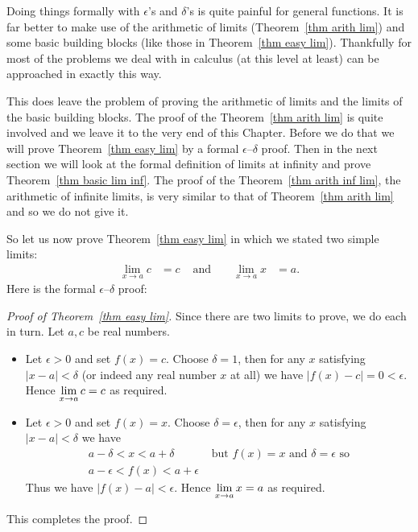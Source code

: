Doing things formally with $\epsilon$'s and $\delta$'s is quite painful for
general functions. It is far better to make use of the arithmetic of limits
(Theorem~\ref{thm arith lim}) and some basic building blocks (like those in
Theorem~\ref{thm easy lim}). Thankfully for most of the problems we deal with in
calculus (at this level at least) can be approached in exactly this way.

This does leave the problem of proving the arithmetic of limits and the limits
of the basic building blocks. The proof of the Theorem~\ref{thm arith lim} is
quite involved and we leave it to the very end of this Chapter. Before we do
that we will prove Theorem~\ref{thm easy lim} by a formal $\epsilon$--$\delta$
proof. Then in the next section we will look at the formal definition of limits
at infinity and prove Theorem~\ref{thm basic lim inf}. The proof of the
Theorem~\ref{thm arith inf lim}, the arithmetic of infinite limits, is very
similar to that of Theorem~\ref{thm arith lim} and so we do not give it.

So let us now prove Theorem~\ref{thm easy lim} in which we stated two simple
limits:
\begin{align*}
  \lim_{x \to a} c &= c & \text{ and } && \lim_{x \to a} x &= a.
\end{align*}
Here is the formal $\epsilon$--$\delta$ proof:
\begin{proof}[Proof of Theorem~\ref{thm easy lim}]
 Since there are two limits to prove, we do each in turn. Let $a,c$ be real
numbers.
\begin{itemize}
 \item Let $\epsilon>0$ and set $f(x)=c$. Choose $\delta=1$, then for any
$x$ satisfying $|x-a|<\delta$ (or indeed any real number $x$ at all) we have
$|f(x)-c| = 0 <\epsilon$. Hence $\displaystyle \lim_{x \to a} c = c$ as required.

 \item Let $\epsilon>0$ and set $f(x)=x$. Choose $\delta=\epsilon$, then for
any $x$ satisfying $|x-a|<\delta$ we have
\begin{align*}
  a-\delta < x < a+\delta & \text{ but $f(x) = x$ and $\delta=\epsilon$ so} \\
  a-\epsilon < f(x) < a+\epsilon
\end{align*}
Thus we have $|f(x)-a|<\epsilon$. Hence $\displaystyle \lim_{x \to a} x = a$ as required.
\end{itemize}
This completes the proof.
\end{proof}


